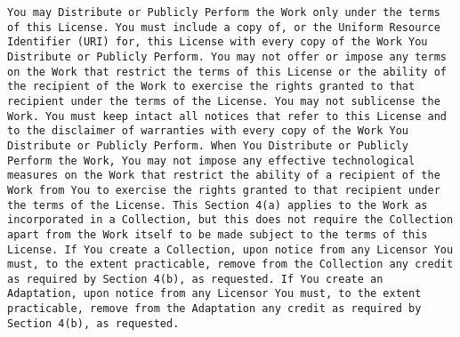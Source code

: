\documentclass[10pt,A4]{book}
\begin{document}
\begin{verbatim}
You may Distribute or Publicly Perform the Work only under the terms of this License. You must include a copy of, or the Uniform Resource Identifier (URI) for, this License with every copy of the Work You Distribute or Publicly Perform. You may not offer or impose any terms on the Work that restrict the terms of this License or the ability of the recipient of the Work to exercise the rights granted to that recipient under the terms of the License. You may not sublicense the Work. You must keep intact all notices that refer to this License and to the disclaimer of warranties with every copy of the Work You Distribute or Publicly Perform. When You Distribute or Publicly Perform the Work, You may not impose any effective technological measures on the Work that restrict the ability of a recipient of the Work from You to exercise the rights granted to that recipient under the terms of the License. This Section 4(a) applies to the Work as incorporated in a Collection, but this does not require the Collection apart from the Work itself to be made subject to the terms of this License. If You create a Collection, upon notice from any Licensor You must, to the extent practicable, remove from the Collection any credit as required by Section 4(b), as requested. If You create an Adaptation, upon notice from any Licensor You must, to the extent practicable, remove from the Adaptation any credit as required by Section 4(b), as requested.

\end{verbatim}
\end{document}

